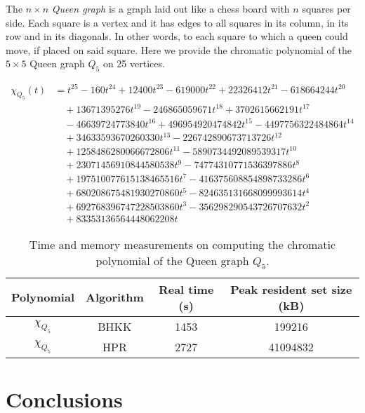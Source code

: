 \documentclass{cslthse-msc}
\begin{document}
The $n \times n$ \emph{Queen graph} is a graph laid out like a chess board with $n$ squares per side. Each square is a vertex and it has edges to all squares in its column, in its row and in its diagonals. In other words, to each square to which a queen could move, if placed on said square. Here we provide the chromatic polynomial of the $5 \times 5$ Queen graph $Q_5$ on 25 vertices.

\begin{equation*}
\begin{split}
\chi_{Q_5}(t) & = t^{25} -160t^{24} + 12400t^{23} -619000t^{22} + 22326412t^{21} -618664244t^{20} \\ & \quad 
+ 13671395276t^{19} -246865059671t^{18} + 3702615662191t^{17} \\ & \quad
-46639724773840t^{16} + 496954920474842t^{15}  -4497756322484864t^{14} \\ & \quad 
+ 34633593670260330t^{13} -226742890673713726t^{12} \\ & \quad 
+ 1258486280066672806t^{11} -5890734492089539317t^{10} \\ & \quad 
+ 23071456910844580538t^9 -74774310771536397886t^8 \\ & \quad  
+ 197510077615138465516t^7 -416375608854898733286t^6  \\ & \quad 
+ 680208675481930270860t^5 -824635131668099993614t^4 \\ & \quad 
+ 692768396747228503860t^3 -356298290543726707632t^2  \\ & \quad 
+ 83353136564448062208t
\end{split}
\end{equation*}

\begin{table}[H]\centering
\begin{tabular}{|c|c|c|c|} \hline
  Polynomial & Algorithm & Real time (s) & Peak resident set size (kB) \\ \hline
  $\chi_{Q_5}$ & BHKK & 1453 & 199216 \\ \hline
  $\chi_{Q_5}$ & HPR & 2727 & 41094832 \\ \hline
\end{tabular}
\caption{Time and memory measurements on computing the chromatic polynomial of the Queen graph $Q_5$.}
\end{table}

\chapter{Conclusions}
\end{document}

